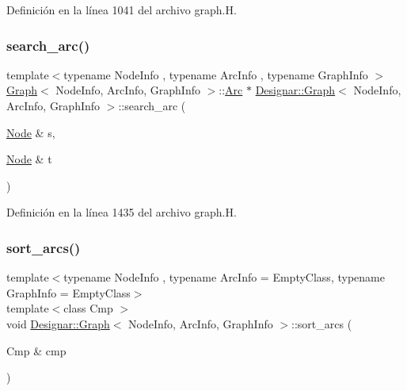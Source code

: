 Definición en la línea 1041 del archivo graph.\+H.

\mbox{\label{class_designar_1_1_graph_afa69dd3cc6bacfed22864f5ad7c189ba}} 
\subsubsection{\texorpdfstring{search\+\_\+arc()}{search\_arc()}}
{\footnotesize\ttfamily template$<$typename Node\+Info , typename Arc\+Info , typename Graph\+Info $>$ \\
\hyperlink{class_designar_1_1_graph}{Graph}$<$ Node\+Info, Arc\+Info, Graph\+Info $>$\+::\hyperlink{class_designar_1_1_graph_a74c730ef4ce2d20f998d72bd25c2b5bf}{Arc} $\ast$ \hyperlink{class_designar_1_1_graph}{Designar\+::\+Graph}$<$ Node\+Info, Arc\+Info, Graph\+Info $>$\+::search\+\_\+arc (\begin{DoxyParamCaption}\item[{\hyperlink{class_designar_1_1_graph_a5dfc7dba9d092ac489c72e40390c37d0}{Node} \&}]{s,  }\item[{\hyperlink{class_designar_1_1_graph_a5dfc7dba9d092ac489c72e40390c37d0}{Node} \&}]{t }\end{DoxyParamCaption})}



Definición en la línea 1435 del archivo graph.\+H.

\mbox{\label{class_designar_1_1_graph_a39af536f6e08248e0d343dcd300713c2}} 
\subsubsection{\texorpdfstring{sort\+\_\+arcs()}{sort\_arcs()}\hspace{0.1cm}{\footnotesize\ttfamily [1/2]}}
{\footnotesize\ttfamily template$<$typename Node\+Info , typename Arc\+Info  = Empty\+Class, typename Graph\+Info  = Empty\+Class$>$ \\
template$<$class Cmp $>$ \\
void \hyperlink{class_designar_1_1_graph}{Designar\+::\+Graph}$<$ Node\+Info, Arc\+Info, Graph\+Info $>$\+::sort\+\_\+arcs (\begin{DoxyParamCaption}\item[{Cmp \&}]{cmp }\end{DoxyParamCaption})\hspace{0.3cm}{\ttfamily [inline]}}



